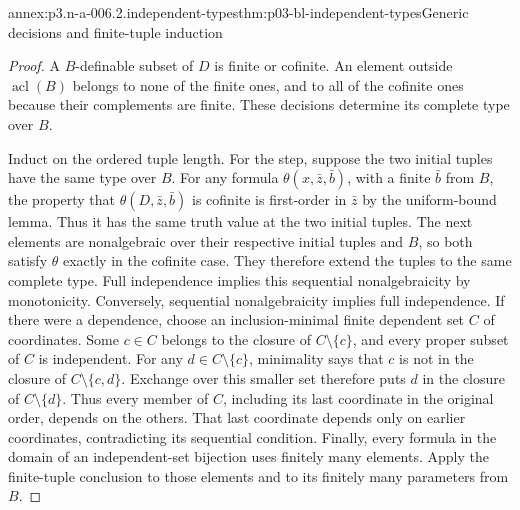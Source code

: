 \begin{annexitem}{annex:p3.n-a-006.2.independent-types}{thm:p03-bl-independent-types}{Generic decisions and finite-tuple induction}
\begin{proof}
A \(B\)-definable subset of \(D\) is finite or cofinite. An element
outside \(\operatorname{acl}(B)\) belongs to none of the finite
ones, and to all of the cofinite ones because their complements are
finite. These decisions determine its complete type over \(B\).

Induct on the ordered tuple length. For the step, suppose the two
initial tuples have the same type over \(B\). For any formula
\(\theta(x,\bar z,\bar b)\), with a finite \(\bar b\) from \(B\),
the property that \(\theta(D,\bar z,\bar b)\) is cofinite is
first-order in \(\bar z\) by the uniform-bound lemma. Thus it has
the same truth value at the two initial tuples. The next elements
are nonalgebraic over their respective initial tuples and \(B\),
so both satisfy \(\theta\) exactly in the cofinite case. They
therefore extend the tuples to the same complete type. Full
independence implies this sequential nonalgebraicity by monotonicity.
Conversely, sequential nonalgebraicity implies full independence.
If there were a dependence, choose an inclusion-minimal finite
dependent set \(C\) of coordinates. Some \(c\in C\) belongs to the
closure of \(C\setminus\{c\}\), and every proper subset of \(C\)
is independent. For any \(d\in C\setminus\{c\}\), minimality says
that \(c\) is not in the closure of \(C\setminus\{c,d\}\).
Exchange over this smaller set therefore puts \(d\) in the closure
of \(C\setminus\{d\}\). Thus every member of \(C\), including
its last coordinate in the original order, depends on the others.
That last coordinate depends only on earlier coordinates,
contradicting its sequential condition. Finally, every formula in
the domain of an independent-set bijection uses finitely many
elements. Apply the finite-tuple conclusion to those elements and
to its finitely many parameters from \(B\).
\end{proof}
\end{annexitem}

